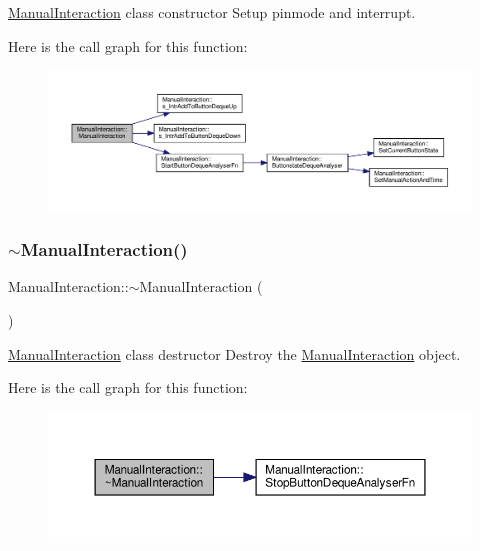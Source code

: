 \hyperlink{classManualInteraction}{Manual\+Interaction} class constructor Setup pinmode and interrupt. 

Here is the call graph for this function\+:
\nopagebreak
\begin{figure}[H]
\begin{center}
\leavevmode
\includegraphics[width=350pt]{classManualInteraction_a6cad93bd00e4954a8eedacf590038f68_cgraph}
\end{center}
\end{figure}
\mbox{\label{classManualInteraction_a761406994ea72ce26d6bef061fb5ae2b}} 
\subsubsection{\texorpdfstring{$\sim$\+Manual\+Interaction()}{~ManualInteraction()}}
{\footnotesize\ttfamily Manual\+Interaction\+::$\sim$\+Manual\+Interaction (\begin{DoxyParamCaption}{ }\end{DoxyParamCaption})}



\hyperlink{classManualInteraction}{Manual\+Interaction} class destructor Destroy the \hyperlink{classManualInteraction}{Manual\+Interaction} object. 

Here is the call graph for this function\+:
\nopagebreak
\begin{figure}[H]
\begin{center}
\leavevmode
\includegraphics[width=350pt]{classManualInteraction_a761406994ea72ce26d6bef061fb5ae2b_cgraph}
\end{center}
\end{figure}


